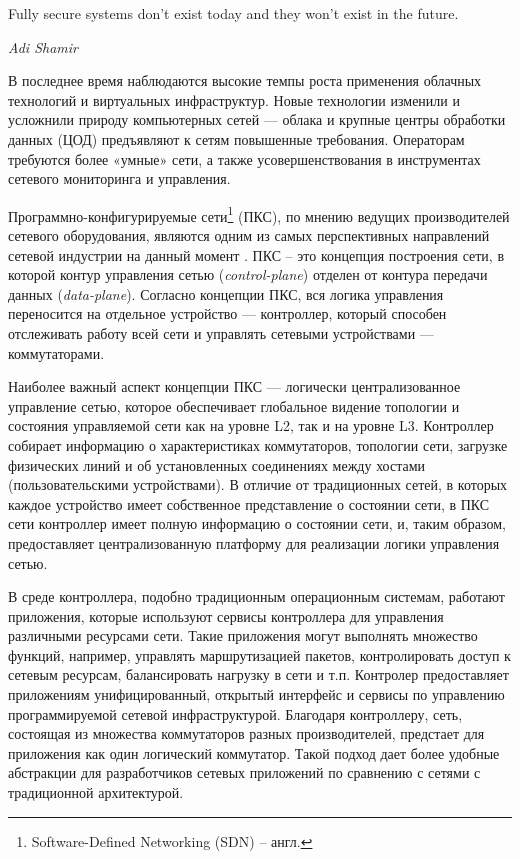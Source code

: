 \documentclass[../thesis.tex]{subfiles}
\begin{document}
\intro \label{chapter:intro}

\renewcommand{\epigraphrule}{0pt}
\setlength{\afterepigraphskip}{6pt}
\epigraph{Fully secure systems don't exist today and they won't exist in the future.}{\textit{Adi Shamir}}

В последнее время наблюдаются высокие темпы роста применения облачных технологий и виртуальных инфраструктур.
Новые технологии изменили и усложнили природу компьютерных сетей --- облака и крупные центры обработки данных (ЦОД) предъявляют к сетям повышенные требования.
Операторам требуются более «умные» сети, а также усовершенствования в инструментах сетевого мониторинга и управления.

Программно-конфигурируемые сети\footnote{Software-Defined Networking (SDN) – англ.} (ПКС), по мнению ведущих производителей сетевого оборудования, являются одним из самых перспективных направлений сетевой индустрии на данный момент \cite{kreutz2015software}.
ПКС – это концепция построения сети, в которой контур управления сетью (\textit{control-plane}) отделен от контура передачи данных (\textit{data-plane}).
Согласно концепции ПКС, вся логика управления переносится на отдельное устройство --- контроллер, который способен отслеживать работу всей сети и управлять сетевыми устройствами --- коммутаторами.

Наиболее важный аспект концепции ПКС --- логически централизованное управление сетью, которое обеспечивает глобальное видение топологии и состояния управляемой сети как на уровне L2, так и на уровне L3.
Контроллер собирает информацию о характеристиках коммутаторов, топологии сети, загрузке физических линий и об установленных соединениях между хостами (пользовательскими устройствами).
В отличие от традиционных сетей, в которых каждое устройство имеет собственное представление о состоянии сети, в ПКС сети контроллер имеет полную информацию о состоянии сети, и, таким образом, предоставляет централизованную платформу для реализации логики управления сетью.

В среде контроллера, подобно традиционным операционным системам, работают приложения, которые используют сервисы контроллера для управления различными ресурсами сети.
Такие приложения могут выполнять множество функций, например, управлять маршрутизацией пакетов, контролировать доступ к сетевым ресурсам, балансировать нагрузку в сети и т.п.
Контролер предоставляет приложениям унифицированный, открытый интерфейс и сервисы по управлению программируемой сетевой инфраструктурой.
Благодаря контроллеру, сеть, состоящая из множества коммутаторов разных производителей, предстает для приложения как один логический коммутатор.
Такой подход дает более удобные абстракции для разработчиков сетевых приложений по сравнению с сетями с традиционной архитектурой.
\end{document}
